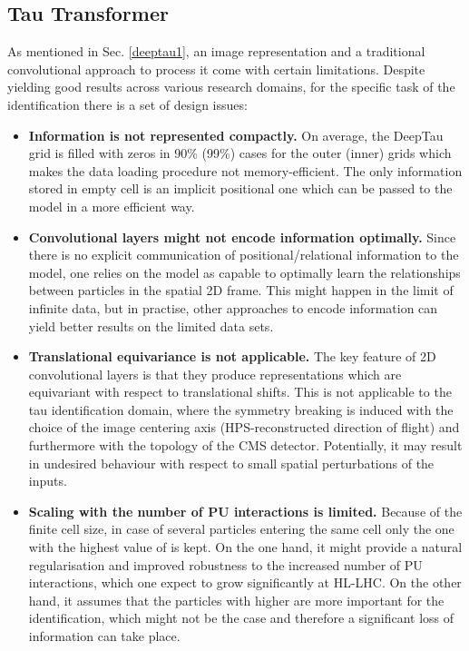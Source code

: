 \subsection{Tau Transformer} \label{tat}
As mentioned in Sec. \ref{deeptau1}, an image representation and a traditional convolutional approach to process it come with certain limitations. Despite yielding good results across various research domains, for the specific task of the \tauh identification there is a set of design issues:
\begin{itemize}
    \item \textbf{Information is not represented compactly.} On average, the DeepTau grid is filled with zeros in 90\% (99\%) cases for the outer (inner) grids which makes the data loading procedure not memory-efficient. The only information stored in empty cell is an implicit positional one which can be passed to the model in a more efficient way.
    \item \textbf{Convolutional layers might not encode information optimally.} Since there is no explicit communication of positional/relational information to the model, one relies on the model as capable to optimally learn the relationships between particles in the spatial 2D frame. This might happen in the limit of infinite data, but in practise, other approaches to encode information can yield better results on the limited data sets.
    \item \textbf{Translational equivariance is not applicable.} The key feature of 2D convolutional layers is that they produce representations which are equivariant with respect to translational shifts. This is not applicable to the tau identification domain, where the symmetry breaking is induced with the choice of the image centering axis (HPS-reconstructed direction of flight) and furthermore with the topology of the CMS detector. Potentially, it may result in undesired behaviour with respect to small spatial perturbations of the inputs. 
    \item \textbf{Scaling with the number of PU interactions is limited.} Because of the finite cell size, in case of several particles entering the same cell only the one with the highest value of \pt is kept. On the one hand, it might provide a natural regularisation and improved robustness to the increased number of PU interactions, which one expect to grow significantly at HL-LHC. On the other hand, it assumes that the particles with higher \pt are more important for the \tauh identification, which might not be the case and therefore a significant loss of information can take place.  
\end{itemize}

